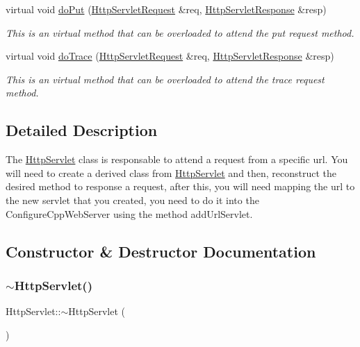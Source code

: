 \begin{DoxyCompactItemize}
virtual void \hyperlink{class_http_servlet_a33edf48c6762b1c9f5e7faaf47135073}{do\+Put} (\hyperlink{class_http_servlet_request}{Http\+Servlet\+Request} \&req, \hyperlink{class_http_servlet_response}{Http\+Servlet\+Response} \&resp)
\begin{DoxyCompactList}\small\item\em This is an virtual method that can be overloaded to attend the put request method. \end{DoxyCompactList}\item 
virtual void \hyperlink{class_http_servlet_a42a6a6a556f43b3447d4ff56d9d574cb}{do\+Trace} (\hyperlink{class_http_servlet_request}{Http\+Servlet\+Request} \&req, \hyperlink{class_http_servlet_response}{Http\+Servlet\+Response} \&resp)
\begin{DoxyCompactList}\small\item\em This is an virtual method that can be overloaded to attend the trace request method. \end{DoxyCompactList}\end{DoxyCompactItemize}


\subsection{Detailed Description}
The \hyperlink{class_http_servlet}{Http\+Servlet} class is responsable to attend a request from a specific url. You will need to create a derived class from \hyperlink{class_http_servlet}{Http\+Servlet} and then, reconstruct the desired method to response a request, after this, you will need mapping the url to the new servlet that you created, you need to do it into the Configure\+Cpp\+Web\+Server using the method add\+Url\+Servlet. 

\subsection{Constructor \& Destructor Documentation}
\mbox{\label{class_http_servlet_a912d39c84d82c498e0a5b319dcbe2be4}} 
\subsubsection{\texorpdfstring{$\sim$\+Http\+Servlet()}{~HttpServlet()}}
{\footnotesize\ttfamily Http\+Servlet\+::$\sim$\+Http\+Servlet (\begin{DoxyParamCaption}{ }\end{DoxyParamCaption})\hspace{0.3cm}{\ttfamily [virtual]}}



